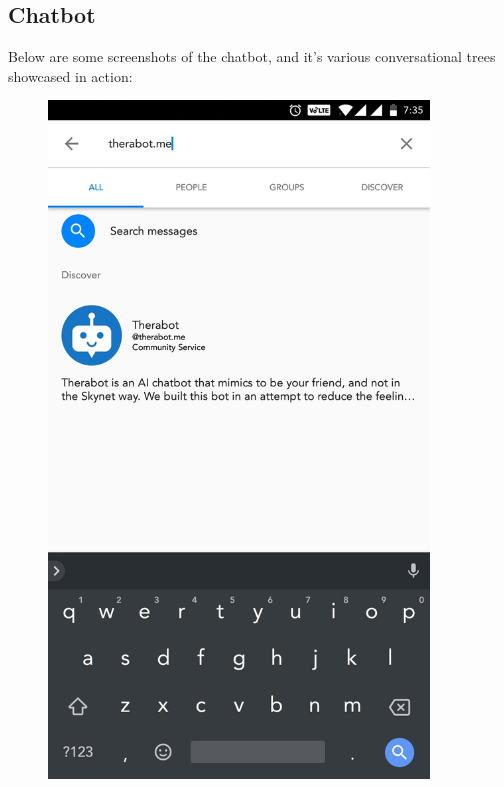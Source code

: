 \pagebreak

\subsection{Chatbot}

\noindent
Below are some screenshots of the chatbot, and it’s various conversational trees showcased in action:

\vspace*{\fill}
\begin{figure}[H]
    \centering
    \begin{minipage}{0.45\textwidth}
        \centering
        \includegraphics[width=0.9\textwidth]{images/screenshots/chatbot/1.jpg}

\end{minipage}
\end{figure}
